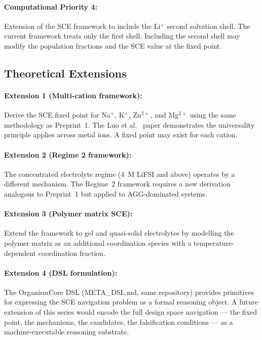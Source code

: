 \documentclass[11pt]{article}
\theoremstyle{plain}
\theoremstyle{definition}
\theoremstyle{remark}
\begin{document}
\paragraph{Computational Priority 4:}
Extension of the SCE framework to include the Li$^+$
second solvation shell.  The current framework treats
only the first shell.  Including the second shell may
modify the population fractions and the SCE value at
the fixed point.

\subsection{Theoretical Extensions}

\paragraph{Extension 1 (Multi-cation framework):}
Derive the SCE fixed point for Na$^+$, K$^+$, Zn$^{2+}$,
and Mg$^{2+}$ using the same methodology as Preprint~1.
The Luo et al.\ \cite{Luo2025} paper demonstrates the
universality principle applies across metal ions.  A fixed
point may exist for each cation.

\paragraph{Extension 2 (Regime 2 framework):}
The concentrated electrolyte regime (4~M LiFSI and above)
operates by a different mechanism.  The Regime~2 framework
requires a new derivation analogous to Preprint~1 but
applied to AGG-dominated systems.

\paragraph{Extension 3 (Polymer matrix SCE):}
Extend the framework to gel and quasi-solid electrolytes
by modelling the polymer matrix as an additional coordination
species with a temperature-dependent coordination fraction.

\paragraph{Extension 4 (DSL formulation):}
The OrganismCore DSL (META\_DSL.md, same repository) provides
primitives for expressing the SCE navigation problem as a
formal reasoning object.  A future extension of this series
would encode the full design space navigation --- the fixed
point, the mechanisms, the candidates, the falsification
conditions --- as a machine-executable reasoning substrate.
\end{document}
